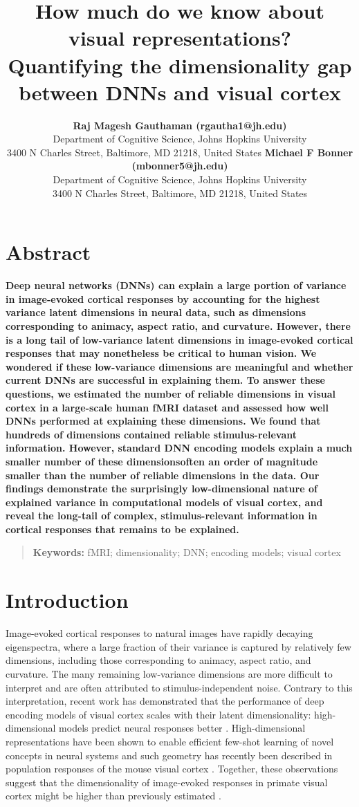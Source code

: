 \documentclass[10pt,letterpaper]{article}
\title{How much do we know about visual representations? \\Quantifying the dimensionality gap between DNNs and visual cortex}
\author{
    {\large \bf Raj Magesh Gauthaman (rgautha1@jh.edu)} \\
    Department of Cognitive Science, Johns Hopkins University\\
    3400 N Charles Street, Baltimore, MD 21218, United States
    \AND
    {\large \bf Michael F Bonner (mbonner5@jh.edu)} \\
    Department of Cognitive Science, Johns Hopkins University\\
    3400 N Charles Street, Baltimore, MD 21218, United States
}
\begin{document}
\maketitle

\section{Abstract}
{
\bf
Deep neural networks (DNNs) can explain a large portion of variance in image-evoked cortical responses by accounting for the highest variance latent dimensions in neural data, such as dimensions corresponding to animacy, aspect ratio, and curvature. However, there is a long tail of low-variance latent dimensions in image-evoked cortical responses that may nonetheless be critical to human vision. We wondered if these low-variance dimensions are meaningful and whether current DNNs are successful in explaining them. To answer these questions, we estimated the number of reliable dimensions in visual cortex in a large-scale human fMRI dataset and assessed how well DNNs performed at explaining these dimensions. We found that hundreds of dimensions contained reliable stimulus-relevant information. However, standard DNN encoding models explain a much smaller number of these dimensions\textemdash often an order of magnitude smaller than the number of reliable dimensions in the data. Our findings demonstrate the surprisingly low-dimensional nature of explained variance in computational models of visual cortex, and reveal the long-tail of complex, stimulus-relevant information in cortical responses that remains to be explained.
}

\begin{quote}
    \small
    \textbf{Keywords:} 
    fMRI; dimensionality; DNN; encoding models; visual cortex
\end{quote}

\section{Introduction}

Image-evoked cortical responses to natural images have rapidly decaying eigenspectra, where a large fraction of their variance is captured by relatively few dimensions, including those corresponding to animacy, aspect ratio, and curvature. The many remaining low-variance dimensions are more difficult to interpret and are often attributed to stimulus-independent noise. Contrary to this interpretation, recent work has demonstrated that the performance of deep encoding models of visual cortex scales with their latent dimensionality: high-dimensional models predict neural responses better \cite{Elmoznino2021}. High-dimensional representations have been shown to enable efficient few-shot learning of novel concepts in neural systems \cite{Sorscher2021} and such geometry has recently been described in population responses of the mouse visual cortex \cite{Stringer2019}. Together, these observations suggest that the dimensionality of image-evoked responses in primate visual cortex might be higher than previously estimated \cite{Haxby2011, Lehky2014}.
\end{document}
